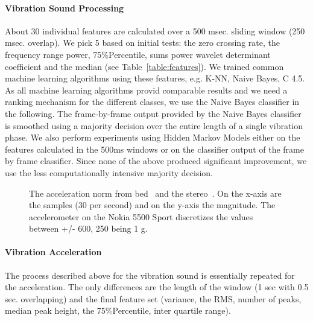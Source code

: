 \paragraph{Vibration Sound Processing}
About 30 individual features are calculated
over a 500 msec. sliding window (250 msec. overlap). We
pick 5 based on initial tests: the zero
crossing rate, the frequency range power, 75\%Percentile, sums power
wavelet determinant coefficient and the median (see Table~\ref{table:features}). We
trained common machine learning algorithms using these features, e.g. K-NN, Naive Bayes, C
4.5. As all machine learning algorithms provid comparable results and we need a ranking mechanism for the different
classes, we use the Naive Bayes classifier in the following. 
The frame-by-frame output provided by the Naive Bayes classifier is
smoothed using a majority decision over the entire length of a single
vibration phase. We also perform experiments using Hidden
Markov Models either on the features calculated in the 500ms windows
or on the classifier output of the frame by frame classifier. Since
none of the above produced significant improvement, we use
the less computationally intensive majority decision.


\begin{figure}[t]
  \begin{center}
   \end{center}
\vspace{-10pt}
\caption[Acceleration norm examples]{
The acceleration norm from 
bed~ and the stereo~. On the x-axis are the samples (30 per second) and on the y-axis the magnitude. The accelerometer on the Nokia 5500 Sport discretizes the values between +/- 600, 250 being 1 g.}
\label{fig:accelVib}
\vspace{-10pt}
\end{figure} 


\paragraph{Vibration Acceleration}
The process described above for the vibration sound is essentially
repeated for the acceleration. The only differences are the length of
the window  (1 sec with 0.5 sec. overlapping) and the final feature
set (variance, the RMS, number of peaks, median peak height, the
75\%Percentile, inter quartile range). 

